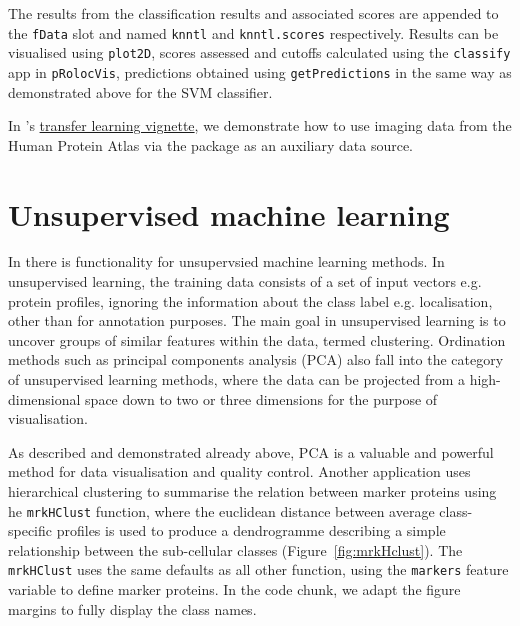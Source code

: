 \begin{knitrout}
\begin{kframe}
\begin{alltt}
 \hlkwb{<-}     \hlstd{=} \hlstd{(}\hlstd{,} \hlstd{))}
\end{alltt}
\end{kframe}
\end{knitrout}

The results from the classification results and associated scores are
appended to the \texttt{fData} slot and named \texttt{knntl} and
\texttt{knntl.scores} respectively. Results can be visualised using
\texttt{plot2D}, scores assessed and cutoffs calculated using the
\texttt{classify} app in \texttt{pRolocVis}, predictions obtained
using \texttt{getPredictions} in the same way as demonstrated above
for the SVM classifier.

In 's
\href{http://bioconductor.org/packages/release/bioc/vignettes/pRoloc/inst/doc/pRoloc-transfer-learning.pdf}{transfer
  learning vignette}, we demonstrate how to use imaging data from the
Human Protein Atlas \cite{Uhlen:2010} via the  package
\cite{hpar} as an auxiliary data source.

\section*{Unsupervised machine learning}

In  there is functionality for unsupervsied machine
learning methods. In unsupervised learning, the training data consists
of a set of input vectors e.g. protein profiles, ignoring the
information about the class label e.g. localisation, other than for
annotation purposes. The main goal in unsupervised learning is to
uncover groups of similar features within the data, termed
clustering. Ordination methods such as principal components analysis
(PCA) also fall into the category of unsupervised learning methods,
where the data can be projected from a high-dimensional space down to
two or three dimensions for the purpose of visualisation.

As described and demonstrated already above, PCA is a valuable and
powerful method for data visualisation and quality control. Another
application uses hierarchical clustering to summarise the relation
between marker proteins using he \texttt{mrkHClust} function, where
the euclidean distance between average class-specific profiles is used
to produce a dendrogramme describing a simple relationship between the
sub-cellular classes (Figure~\ref{fig:mrkHclust}). The
\texttt{mrkHClust} uses the same defaults as all other function, using
the \texttt{markers} feature variable to define marker proteins. In
the code chunk, we adapt the figure margins to fully display the class
names.


